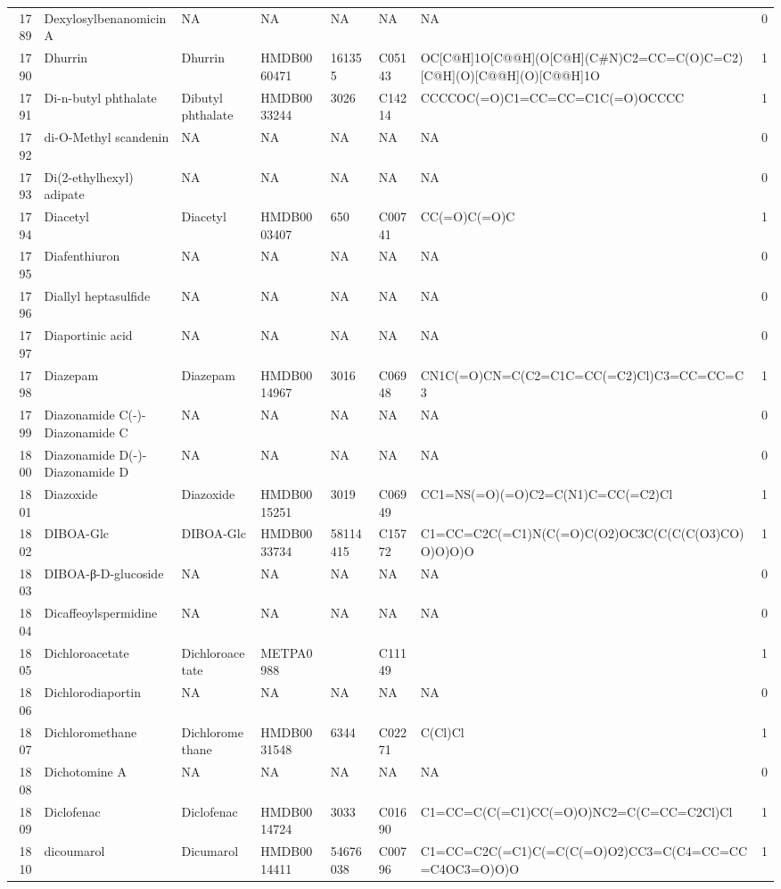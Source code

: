 \documentclass[a4paper]{article}
\begin{document}
\begin{longtable}{rlllllll}
  1789 & Dexylosylbenanomicin A & NA & NA & NA & NA & NA & 0 \\ 
  1790 & Dhurrin & Dhurrin & HMDB0060471 & 161355 & C05143 & OC[C@H]1O[C@@H](O[C@H](C\#N)C2=CC=C(O)C=C2)[C@H](O)[C@@H](O)[C@@H]1O & 1 \\ 
  1791 & Di-n-butyl phthalate & Dibutyl phthalate & HMDB0033244 & 3026 & C14214 & CCCCOC(=O)C1=CC=CC=C1C(=O)OCCCC & 1 \\ 
  1792 & di-O-Methyl scandenin & NA & NA & NA & NA & NA & 0 \\ 
  1793 & Di(2-ethylhexyl) adipate & NA & NA & NA & NA & NA & 0 \\ 
  1794 & Diacetyl & Diacetyl & HMDB0003407 & 650 & C00741 & CC(=O)C(=O)C & 1 \\ 
  1795 & Diafenthiuron & NA & NA & NA & NA & NA & 0 \\ 
  1796 & Diallyl heptasulfide & NA & NA & NA & NA & NA & 0 \\ 
  1797 & Diaportinic acid & NA & NA & NA & NA & NA & 0 \\ 
  1798 & Diazepam & Diazepam & HMDB0014967 & 3016 & C06948 & CN1C(=O)CN=C(C2=C1C=CC(=C2)Cl)C3=CC=CC=C3 & 1 \\ 
  1799 & Diazonamide C(-)-Diazonamide C & NA & NA & NA & NA & NA & 0 \\ 
  1800 & Diazonamide D(-)-Diazonamide D & NA & NA & NA & NA & NA & 0 \\ 
  1801 & Diazoxide & Diazoxide & HMDB0015251 & 3019 & C06949 & CC1=NS(=O)(=O)C2=C(N1)C=CC(=C2)Cl & 1 \\ 
  1802 & DIBOA-Glc & DIBOA-Glc & HMDB0033734 & 58114415 & C15772 & C1=CC=C2C(=C1)N(C(=O)C(O2)OC3C(C(C(C(O3)CO)O)O)O)O & 1 \\ 
  1803 & DIBOA-β-D-glucoside & NA & NA & NA & NA & NA & 0 \\ 
  1804 & Dicaffeoylspermidine & NA & NA & NA & NA & NA & 0 \\ 
  1805 & Dichloroacetate & Dichloroacetate & METPA0988 &  & C11149 &  & 1 \\ 
  1806 & Dichlorodiaportin & NA & NA & NA & NA & NA & 0 \\ 
  1807 & Dichloromethane & Dichloromethane & HMDB0031548 & 6344 & C02271 & C(Cl)Cl & 1 \\ 
  1808 & Dichotomine A & NA & NA & NA & NA & NA & 0 \\ 
  1809 & Diclofenac & Diclofenac & HMDB0014724 & 3033 & C01690 & C1=CC=C(C(=C1)CC(=O)O)NC2=C(C=CC=C2Cl)Cl & 1 \\ 
  1810 & dicoumarol & Dicumarol & HMDB0014411 & 54676038 & C00796 & C1=CC=C2C(=C1)C(=C(C(=O)O2)CC3=C(C4=CC=CC=C4OC3=O)O)O & 1 \\ 

\end{longtable}
\end{document}
